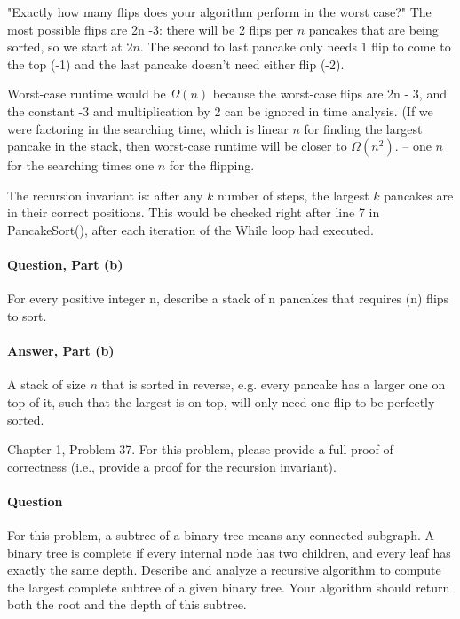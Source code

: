 \documentclass{article}
\begin{document}
{"Exactly how many flips does your algorithm perform in the worst case?" The most possible flips are 2n -3: there will be 2 flips per $n$ pancakes that are being sorted, so we start at $2n$. The second to last pancake only needs 1 flip to come to the top (-1) and the last pancake doesn't need either flip (-2). 

Worst-case runtime would be $\Omega(n)$ because the worst-case flips are 2n - 3, and the constant -3 and multiplication by 2 can be ignored in time analysis. (If we were factoring in the searching time, which is linear $n$ for finding the largest pancake in the stack, then worst-case runtime will be closer to $\Omega(n^2).$ -- one $n$ for the searching times one $n$ for the flipping.

The recursion invariant is: after any $k$ number of steps, the largest $k$ pancakes are in their correct positions. This would be checked right after line 7 in PancakeSort(), after each iteration of the While loop had executed.

\paragraph{Question, Part (b)}{For every positive integer n, describe a stack of n pancakes that requires (n) flips to sort.}
\paragraph{Answer, Part (b)}{A stack of size $n$ that is sorted in reverse, e.g. every pancake has a larger one on top of it, such that the largest is on top, will only need one flip to be perfectly sorted.}

\collab{\todo{}}

Chapter 1, Problem 37.  For this problem, please provide a full proof of
correctness (i.e., provide a proof for the recursion invariant).

\paragraph{Question}{For this problem, a subtree of a binary tree means any connected subgraph. A binary tree is complete if every internal node has two children, and every
leaf has exactly the same depth. Describe and analyze a recursive algorithm
to compute the largest complete subtree of a given binary tree. Your algorithm
should return both the root and the depth of this subtree.}

}
\end{document}
